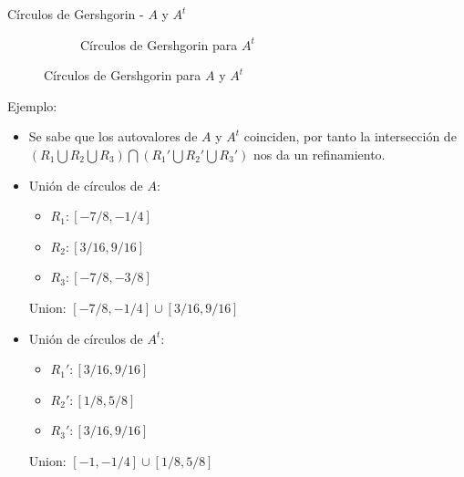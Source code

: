 \documentclass[11pt]{beamer}
\begin{document}
\begin{frame}{C\'irculos de Gershgorin - $A$ y $A^t$}
\begin{figure}
\begin{subfigure}{0.48\textwidth}
          \caption{C\'irculos de Gershgorin para $A^t$}          
        \end{subfigure}
        \caption{C\'irculos de Gershgorin para $A$ y $A^t$}        
      \end{figure}
    \end{frame}
    \begin{frame}{Ejemplo:}
      \begin{itemize}
        \item<1-> Se sabe que los autovalores de $A$ y $A^t$ coinciden, por tanto
        la intersecci\'on de $(R_1\bigcup R_2\bigcup R_3) \bigcap (R_1' \bigcup R_2' \bigcup R_3')$ nos da un refinamiento.
        \item<2-> Unión de c\'irculos de $A$: 
        \begin{itemize}
          \item $R_1: [-7/8,-1/4]$
          \item $R_2: [3/16,9/16]$
          \item $R_3: [-7/8,-3/8]$
        \end{itemize}
        {\centering Union: $[-7/8,-1/4]\cup[3/16,9/16]$}
        \item<3-> Unión de c\'irculos de $A^t$:
        \begin{itemize}
          \item $R_1': [3/16,9/16]$
          \item $R_2': [1/8,5/8]$
          \item $R_3': [3/16,9/16]$
        \end{itemize}
        {\centering Union: $[-1,-1/4]\cup[1/8,5/8]$}         
      \end{itemize}
    \end{frame}
\end{document}
